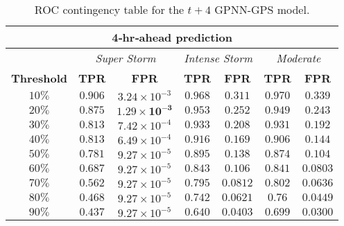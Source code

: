 \begin{table}[ht]
	\centering
	\caption{ROC contingency table for the $t+4$ GPNN-GPS model.}
	\label{table:rocgpnn4h}
	\begin{tabular}
		{c| c c | c c | c c}
		\hline
		\multicolumn{7}{c}{\textbf{4‐hr‐ahead prediction}} \\ 
		\hline
		 & \multicolumn{2}{c}{\textit{Super Storm}} & \multicolumn{2}{c}{\textit{Intense Storm}} & \multicolumn{2}{c}{\textit{Moderate}} \\ 
		\hline
		\textbf{Threshold} & \textbf{TPR} & \textbf{FPR} & \textbf{TPR} & \textbf{FPR} & \textbf{TPR} & \textbf{FPR} \\ 
		\hline
		$10\%$ & $0.906$ & $3.24\times10^{-3}$ & $0.968$ & $0.311$ & $0.970$ & $0.339$ \\ 
		$20\%$ & $\mathbf{0.875}$ & $\mathbf{1.29\times10^{-3}}$ & $0.953$ & $0.252$ & $0.949$ & $0.243$ \\ 
		$30\%$ & $0.813$ & $7.42\times10^{-4}$ & $0.933$ & $0.208$ & $0.931$ & $0.192$ \\ 
		$40\%$ & $0.813$ & $6.49\times10^{-4}$ & $\mathbf{0.916}$ & $\mathbf{0.169}$ & $0.906$ & $0.144$ \\ 
		$50\%$ & $0.781$ & $9.27\times10^{-5}$ & $0.895$ & $0.138$ & $\mathbf{0.874}$ & $\mathbf{0.104}$ \\ 
		$60\%$ & $0.687$ & $9.27\times10^{-5}$ & $0.843$ & $0.106$ & $0.841$ & $0.0803$ \\ 
		$70\%$ & $0.562$ & $9.27\times10^{-5}$ & $0.795$ & $0.0812$ & $0.802$ & $0.0636$ \\ 
		$80\%$ & $0.468$ & $9.27\times10^{-5}$ & $0.742$ & $0.0621$ & $0.76$ & $0.0449$ \\ 
		$90\%$ & $0.437$ & $9.27\times10^{-5}$ & $0.640$ & $0.0403$ & $0.699$ & $0.0300$\\
		\hline
	\end{tabular}
\end{table}

